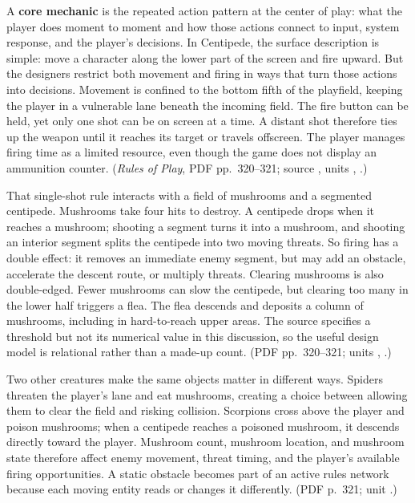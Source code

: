 A \textbf{core mechanic} is the repeated action pattern at the center of play: what the player does moment to moment and how those actions connect to input, system response, and the player's decisions. In Centipede, the surface description is simple: move a character along the lower part of the screen and fire upward. But the designers restrict both movement and firing in ways that turn those actions into decisions. Movement is confined to the bottom fifth of the playfield, keeping the player in a vulnerable lane beneath the incoming field. The fire button can be held, yet only one shot can be on screen at a time. A distant shot therefore ties up the weapon until it reaches its target or travels offscreen. The player manages firing time as a limited resource, even though the game does not display an ammunition counter. (\emph{Rules of Play}, PDF pp.~320--321; source , units , .)

That single-shot rule interacts with a field of mushrooms and a segmented centipede. Mushrooms take four hits to destroy. A centipede drops when it reaches a mushroom; shooting a segment turns it into a mushroom, and shooting an interior segment splits the centipede into two moving threats. So firing has a double effect: it removes an immediate enemy segment, but may add an obstacle, accelerate the descent route, or multiply threats. Clearing mushrooms is also double-edged. Fewer mushrooms can slow the centipede, but clearing too many in the lower half triggers a flea. The flea descends and deposits a column of mushrooms, including in hard-to-reach upper areas. The source specifies a threshold but not its numerical value in this discussion, so the useful design model is relational rather than a made-up count. (PDF pp.~320--321; units , .)

Two other creatures make the same objects matter in different ways. Spiders threaten the player's lane and eat mushrooms, creating a choice between allowing them to clear the field and risking collision. Scorpions cross above the player and poison mushrooms; when a centipede reaches a poisoned mushroom, it descends directly toward the player. Mushroom count, mushroom location, and mushroom state therefore affect enemy movement, threat timing, and the player's available firing opportunities. A static obstacle becomes part of an active rules network because each moving entity reads or changes it differently. (PDF p.~321; unit .)

